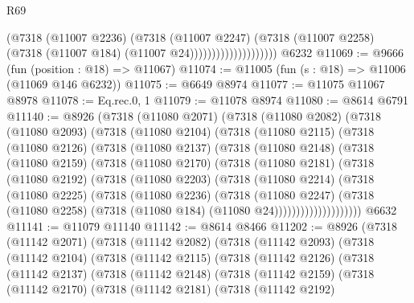 \begin{lexlean}{R69}
\begin{coremodule}
{                                  (@7318
                                    (@11007 @2236)
                                    (@7318
                                      (@11007 @2247)
                                      (@7318
                                        (@11007 @2258)
                                        (@7318 (@11007 @184) (@11007 @24))))))))))))))))))))
    @6232
@11069 := @9666 (fun (position : @18) => @11067)
@11074 := @11005 (fun (s : @18) => @11006 (@11069 @146 @6232))
@11075 := @6649 @8974
@11077 := @11075 @11067 @8978
@11078 := Eq.rec.{0, 1}
@11079 := @11078 @8974
@11080 := @8614 @6791
@11140 := @8926
    (@7318
      (@11080 @2071)
      (@7318
        (@11080 @2082)
        (@7318
          (@11080 @2093)
          (@7318
            (@11080 @2104)
            (@7318
              (@11080 @2115)
              (@7318
                (@11080 @2126)
                (@7318
                  (@11080 @2137)
                  (@7318
                    (@11080 @2148)
                    (@7318
                      (@11080 @2159)
                      (@7318
                        (@11080 @2170)
                        (@7318
                          (@11080 @2181)
                          (@7318
                            (@11080 @2192)
                            (@7318
                              (@11080 @2203)
                              (@7318
                                (@11080 @2214)
                                (@7318
                                  (@11080 @2225)
                                  (@7318
                                    (@11080 @2236)
                                    (@7318
                                      (@11080 @2247)
                                      (@7318
                                        (@11080 @2258)
                                        (@7318 (@11080 @184) (@11080 @24))))))))))))))))))))
    @6632
@11141 := @11079 @11140
@11142 := @8614 @8466
@11202 := @8926
    (@7318
      (@11142 @2071)
      (@7318
        (@11142 @2082)
        (@7318
          (@11142 @2093)
          (@7318
            (@11142 @2104)
            (@7318
              (@11142 @2115)
              (@7318
                (@11142 @2126)
                (@7318
                  (@11142 @2137)
                  (@7318
                    (@11142 @2148)
                    (@7318
                      (@11142 @2159)
                      (@7318
                        (@11142 @2170)
                        (@7318
                          (@11142 @2181)
                          (@7318
                            (@11142 @2192)
}
\end{coremodule}
\end{lexlean}
